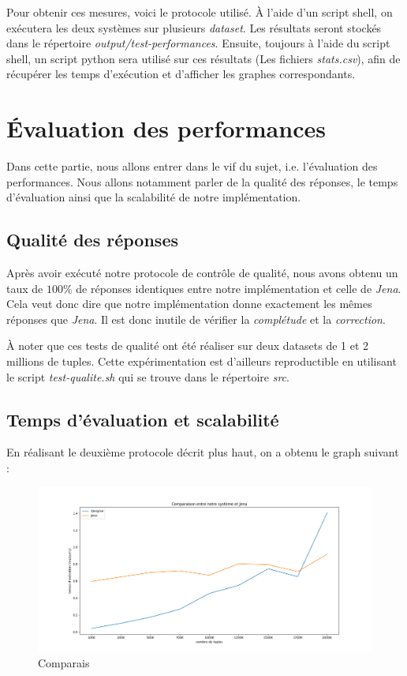 \documentclass[12pt,titlepage]{article}
\begin{document}
Pour obtenir ces mesures, voici le protocole utilisé. À l'aide d'un script shell, on exécutera les deux systèmes sur plusieurs \textit{dataset}. Les résultats seront stockés dans le répertoire \textit{output/test-performances}. Ensuite, toujours à l'aide du script shell, un script python sera utilisé sur ces résultats (Les fichiers \textit{stats.csv}), afin de récupérer les temps d'exécution et d'afficher les graphes correspondants.

\section{Évaluation des performances}

Dans cette partie, nous allons entrer dans le vif du sujet, i.e. l'évaluation des performances. Nous allons notamment parler de la qualité des réponses, le temps d'évaluation ainsi que la scalabilité de notre implémentation.

\subsection{Qualité des réponses}

Après avoir exécuté notre protocole de contrôle de qualité, nous avons obtenu un taux de $100\%$ de réponses identiques entre notre implémentation et celle de \textit{Jena}. Cela veut donc dire que notre implémentation donne exactement les mêmes réponses que \textit{Jena}. Il est donc inutile de vérifier la \textit{complétude} et la \textit{correction}.

À noter que ces tests de qualité ont été réaliser sur deux datasets de 1 et 2 millions de tuples. Cette expérimentation est d'ailleurs reproductible en utilisant le script \textit{test-qualite.sh} qui se trouve dans le répertoire \textit{src}.

\subsection{Temps d'évaluation et scalabilité}
En réalisant le deuxième protocole décrit plus haut, on a obtenu le graph suivant : 

\begin{figure}[!h]
  \centering
  \includegraphics[width=1.\textwidth]{img/temps_execution.png}
  \caption{Comparais}
\end{figure}
\end{document}
